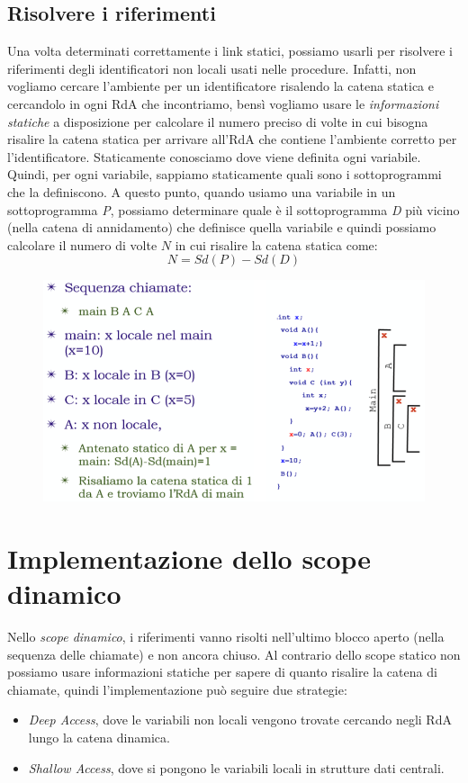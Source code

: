 \documentclass[a4paper,oneside,titlepage]{book}
\begin{document}
\subsection{Risolvere i riferimenti}
Una volta determinati correttamente i link statici, possiamo usarli per risolvere i riferimenti degli identificatori non locali usati nelle procedure. Infatti, non vogliamo cercare l'ambiente per un identificatore risalendo la catena statica e cercandolo in ogni RdA che incontriamo, bensì vogliamo usare le \textit{informazioni statiche} a disposizione per calcolare il numero preciso di volte in cui bisogna risalire la catena statica per arrivare all'RdA che contiene l'ambiente corretto per l'identificatore. Staticamente conosciamo dove viene definita ogni variabile. Quindi, per ogni variabile, sappiamo staticamente quali sono i sottoprogrammi che la definiscono. A questo punto, quando usiamo una variabile in un sottoprogramma \textit{P}, possiamo determinare quale è il sottoprogramma \textit{D} più vicino (nella catena di annidamento) che definisce quella variabile e quindi possiamo calcolare il numero di volte $N$ in cui risalire la catena statica come:
\[ N = Sd(P) - Sd(D) \]
\begin{figure}[htp]
	\centering
	\includegraphics[width=\textwidth, height=\textheight, keepaspectratio]{catStat2.png}
\end{figure}

\section{Implementazione dello scope dinamico}
Nello \textit{scope dinamico}, i riferimenti vanno risolti nell'ultimo blocco aperto (nella sequenza delle chiamate) e non ancora chiuso. Al contrario dello scope statico non possiamo usare informazioni statiche per sapere di quanto risalire la catena di chiamate, quindi l'implementazione può seguire due strategie:
\begin{itemize}
	\item \textit{Deep Access}, dove le variabili non locali vengono trovate cercando negli RdA lungo la catena dinamica.
	\item \textit{Shallow Access}, dove si pongono le variabili locali in strutture dati centrali.
\end{itemize}
\end{document}
